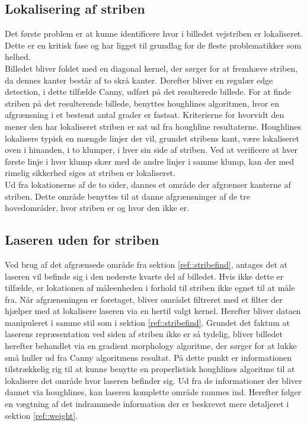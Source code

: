 \subsection{Lokalisering af striben\label{ref::stribefind}}
Det første problem er at kunne identificere hvor i billedet vejstriben er lokaliseret. Dette er en kritisk fase og har ligget til grundlag for de fleste problematikker som helhed.
\\
Billedet bliver foldet med en diagonal kernel, der sørger for at fremhæve striben, da dennes kanter består af to skrå kanter.
Derefter bliver en regulær edge detection, i dette tilfælde Canny, udført på det resulterede billede. For at finde striben på det resulterende billede, benyttes houghlines algoritmen, hvor en afgrænsning i et bestemt antal grader er fastsat. Kriterierne for hvorvidt den mener den har lokaliseret striben er sat ud fra houghline resultaterne. Houghlines lokalisere typisk en mængde linjer der vil, grundet stribens kant, være lokaliseret oven i hinanden, i to klumper, i hver sin side af striben.
Ved at verificere at hver første linje i hver klump skær med de andre linjer i samme klump, kan der med rimelig sikkerhed siges at striben er lokaliseret.
\\
Ud fra lokationerne af de to sider, dannes et område der afgrænser kanterne af striben. Dette område benyttes til at danne afgrænsninger af de tre hovedområder, hvor striben er og hvor den ikke er.

\newpage

\subsection{Laseren uden for striben}
Ved brug af det afgrænsede område fra sektion \ref{ref::stribefind}, antages det at laseren vil befinde sig i den nederste kvarte del af billedet. Hvis ikke dette er tilfælde, er lokationen af måleenheden i forhold til striben ikke egnet til at måle fra.
Når afgrænsningen er foretaget, bliver området filtreret med et filter der hjælper med at lokalisere laseren via en hertil valgt kernel. Herefter bliver dataen manipuleret i samme stil som i sektion \ref{ref::stribefind}. Grundet det faktum at laserens repræsentation ved siden af striben ikke er så tydelig, bliver billedet herefter behandlet via en gradient morphology algoritme, der sørger for at lukke små huller ud fra Canny algoritmens resultat. På dette punkt er informationen tilstrækkelig rig til at kunne benytte en properlistisk houghlines algoritme til at lokalisere det område hvor laseren befinder sig. Ud fra de informationer der bliver dannet via houghlines, kan laseren komplette område rammes ind. Herefter følger en vægtning af det indrammede information der er beskrevet mere detaljeret i sektion \ref{ref::weight}.

